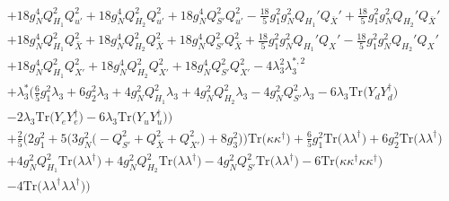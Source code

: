 {\begin{align}
 &+18 g_{N}^{4} Q_{H_1}^{2} Q_{u'}^{2} +18 g_{N}^{4} Q_{H_2}^{2} Q_{u'}^{2} +18 g_{N}^{4} Q_{S'}^{2} Q_{u'}^{2} -\frac{18}{5} g_{1}^{2} g_{N}^{2} Q_{H_1}' Q_{\bar{X}}' +\frac{18}{5} g_{1}^{2} g_{N}^{2} Q_{H_2}' Q_{\bar{X}}' \nonumber \\ 
 &+18 g_{N}^{4} Q_{H_1}^{2} Q_{\bar{X}}^{2} +18 g_{N}^{4} Q_{H_2}^{2} Q_{\bar{X}}^{2} +18 g_{N}^{4} Q_{S'}^{2} Q_{\bar{X}}^{2} +\frac{18}{5} g_{1}^{2} g_{N}^{2} Q_{H_1}' Q_X' -\frac{18}{5} g_{1}^{2} g_{N}^{2} Q_{H_2}' Q_X' \nonumber \\ 
 &+18 g_{N}^{4} Q_{H_1}^{2} Q_{X'}^{2} +18 g_{N}^{4} Q_{H_2}^{2} Q_{X'}^{2} +18 g_{N}^{4} Q_{S'}^{2} Q_{X'}^{2} -4 \lambda_{3}^{2} \lambda_{3}^{*,2} \nonumber \\ 
 &+\lambda_3^* \Big(\frac{6}{5} g_{1}^{2} \lambda_3 +6 g_{2}^{2} \lambda_3 +4 g_{N}^{2} Q_{H_1}^{2} \lambda_3 +4 g_{N}^{2} Q_{H_2}^{2} \lambda_3 -4 g_{N}^{2} Q_{S'}^{2} \lambda_3 -6 \lambda_3 \mbox{Tr}\Big({Y_d  Y_{d}^{\dagger}}\Big) \nonumber \\ 
 &-2 \lambda_3 \mbox{Tr}\Big({Y_e  Y_{e}^{\dagger}}\Big) -6 \lambda_3 \mbox{Tr}\Big({Y_u  Y_{u}^{\dagger}}\Big) \Big)\nonumber \\ 
 &+\frac{2}{5} \Big(2 g_{1}^{2}  + 5 \Big(3 g_{N}^{2} \Big(- Q_{S'}^{2}  + Q_{\bar{X}}^{2} + Q_{X'}^{2}\Big) + 8 g_{3}^{2} \Big)\Big)\mbox{Tr}\Big({\kappa  \kappa^{\dagger}}\Big) +\frac{6}{5} g_{1}^{2} \mbox{Tr}\Big({\lambda  \lambda^{\dagger}}\Big) +6 g_{2}^{2} \mbox{Tr}\Big({\lambda  \lambda^{\dagger}}\Big) \nonumber \\ 
 &+4 g_{N}^{2} Q_{H_1}^{2} \mbox{Tr}\Big({\lambda  \lambda^{\dagger}}\Big) +4 g_{N}^{2} Q_{H_2}^{2} \mbox{Tr}\Big({\lambda  \lambda^{\dagger}}\Big) -4 g_{N}^{2} Q_{S'}^{2} \mbox{Tr}\Big({\lambda  \lambda^{\dagger}}\Big) -6 \mbox{Tr}\Big({\kappa  \kappa^{\dagger}  \kappa  \kappa^{\dagger}}\Big) \nonumber \\ 
 &-4 \mbox{Tr}\Big({\lambda  \lambda^{\dagger}  \lambda  \lambda^{\dagger}}\Big) \Big)
\end{align}} 
